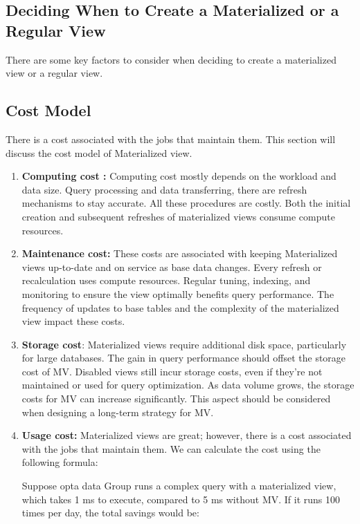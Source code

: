 \subsection{Deciding When to Create a Materialized or a Regular View}There are some key factors to consider when deciding to create a materialized view or a regular view.




 \subsection{Cost Model}
There is a cost associated with the jobs that maintain them. This section will discuss the cost model of Materialized view.\vspace{.4cm}

 \begin{enumerate}[label=\alph*)]
    \item \textbf{Computing cost :} Computing cost mostly depends on the workload and data size. Query processing and data transferring, there are refresh mechanisms to stay accurate. All these procedures are costly. Both the initial creation and subsequent refreshes of materialized views consume compute resources.
    
    \item \textbf{Maintenance cost:} These costs are associated with keeping Materialized views up-to-date and on service as base data changes. Every refresh or recalculation uses compute resources. Regular tuning, indexing, and monitoring to ensure the view optimally benefits query performance. The frequency of updates to base tables and the complexity of the materialized view impact these costs. 
    
    \item \textbf{Storage cost}: Materialized views require additional disk space, particularly for large databases. The gain in query performance should offset the storage cost of MV. Disabled views still incur storage costs, even if they're not maintained or used for query optimization. As data volume grows, the storage costs for MV can increase significantly. This aspect should be considered when designing a long-term strategy for MV. 
     
    \item \textbf{Usage cost:} Materialized views are great; however, there is a cost associated with the jobs that maintain them. We can calculate the cost using the following formula:\cite{10.1145/2206869.2206874}

    

  Suppose opta data Group runs a complex query with a materialized view, which takes 1 ms to execute, compared to 5 ms without MV. If it runs 100 times per day, the total savings would be:

  
  
\end{enumerate}




